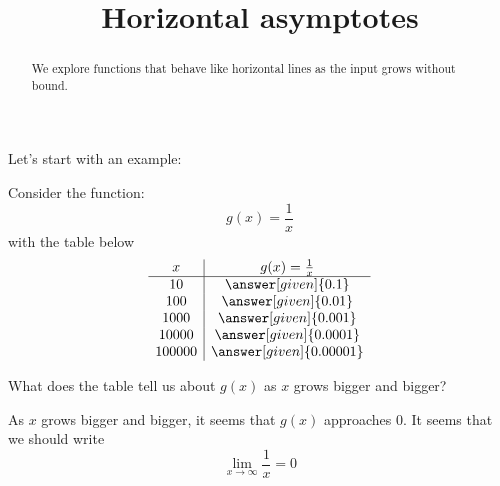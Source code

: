 \documentclass{ximera}
\title[Dig-In:]{Horizontal asymptotes}
\begin{document}
\begin{abstract}
We explore functions that behave like horizontal lines as the input
grows without bound.
\end{abstract}
\maketitle

Let's start with an example:
\begin{example}
Consider the function:
\[
g(x) = \frac{1}{x}
\]
with the table below
\[
\begin{array}{c|c}
x       & g(x)=\frac{1}{x} \\\hline
10      & \answer[given]{0.1} \\ 
100     & \answer[given]{0.01} \\
1000    & \answer[given]{0.001} \\
10000   & \answer[given]{0.0001} \\
100000  & \answer[given]{0.00001}%
\end{array}
\]

  What does the table tell us about $g(x)$ as $x$ grows bigger and bigger?
  \begin{explanation}
    
As $x$ grows bigger and bigger, it seems that $g(x)$ approaches $0$. It seems that we should write
\[
 \lim_{x\to \infty}\frac{1}{x}=0 
 \]
  \end{explanation}
\end{example}
\end{document}
